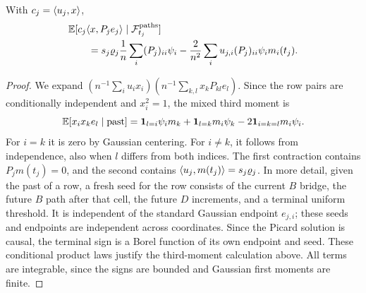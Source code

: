 \begin{lemma}\label{u:lem:onequery}
With $c_j=\langle u_j,x\rangle$,
\begin{equation}\label{u:eq:onequery}
 \begin{aligned}
 &\mathbb E[c_j\langle x,P_je_j\rangle\mid\mathcal F_{t_j}^{\rm paths}]\\
 &\qquad=s_j\varrho_j\frac1n\sum_i(P_j)_{ii}\psi_i
       -\frac2{n^2}\sum_i u_{j,i}(P_j)_{ii}\psi_i m_i(t_j).
 \end{aligned}
\end{equation}
\end{lemma}
\begin{proof}
We expand $(n^{-1}\sum_i u_i x_i)(n^{-1}\sum_{k,l}x_k P_{kl}e_l)$.
Since the row pairs are conditionally independent and $x_i^2=1$, the mixed
third moment is
\[
 \mathbb E[x_i x_k e_l\mid\mathrm{past}]
 =\mathbf1_{l=i}\psi_i m_k+\mathbf1_{l=k}m_i\psi_k
                  -2\mathbf1_{i=k=l}m_i\psi_i.
\]
For $i=k$ it is zero by Gaussian centering. For $i\ne k$, it follows
from independence, also when $l$ differs from both indices. The
first contraction contains $P_jm(t_j)=0$, and the second contains
$\langle u_j,m(t_j)\rangle=s_j\varrho_j$.
In more detail, given the past of a row, a fresh seed for the row consists
of the current $B$ bridge, the future $B$ path after that cell,
the future $D$ increments, and a terminal uniform threshold.
It is independent of the standard Gaussian endpoint $e_{j,i}$;
these seeds and endpoints are independent across coordinates.
Since the Picard solution is causal, the terminal sign is a Borel
function of its own endpoint and seed. These conditional product laws justify the
third-moment calculation above.
All terms are integrable, since the signs are bounded and Gaussian
first moments are finite.
\end{proof}


